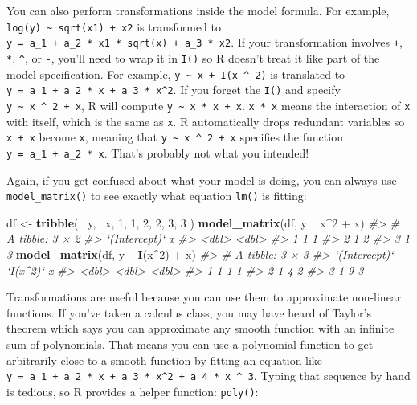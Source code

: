 \documentclass[]{book}
\newenvironment{Shaded}{\begin{snugshade}}{\end{snugshade}}
\newcommand{\KeywordTok}[1]{\textcolor[rgb]{0.13,0.29,0.53}{\textbf{{#1}}}}
\newcommand{\DecValTok}[1]{\textcolor[rgb]{0.00,0.00,0.81}{{#1}}}
\newcommand{\StringTok}[1]{\textcolor[rgb]{0.31,0.60,0.02}{{#1}}}
\newcommand{\CommentTok}[1]{\textcolor[rgb]{0.56,0.35,0.01}{\textit{{#1}}}}
\newcommand{\NormalTok}[1]{{#1}}
\begin{document}
You can also perform transformations inside the model formula. For
example, \texttt{log(y)\ \textasciitilde{}\ sqrt(x1)\ +\ x2} is
transformed to
\texttt{y\ =\ a\_1\ +\ a\_2\ *\ x1\ *\ sqrt(x)\ +\ a\_3\ *\ x2}. If your
transformation involves \texttt{+}, \texttt{*}, \texttt{\^{}}, or
\texttt{-}, you'll need to wrap it in \texttt{I()} so R doesn't treat it
like part of the model specification. For example,
\texttt{y\ \textasciitilde{}\ x\ +\ I(x\ \^{}\ 2)} is translated to
\texttt{y\ =\ a\_1\ +\ a\_2\ *\ x\ +\ a\_3\ *\ x\^{}2}. If you forget
the \texttt{I()} and specify
\texttt{y\ \textasciitilde{}\ x\ \^{}\ 2\ +\ x}, R will compute
\texttt{y\ \textasciitilde{}\ x\ *\ x\ +\ x}. \texttt{x\ *\ x} means the
interaction of \texttt{x} with itself, which is the same as \texttt{x}.
R automatically drops redundant variables so \texttt{x\ +\ x} become
\texttt{x}, meaning that \texttt{y\ \textasciitilde{}\ x\ \^{}\ 2\ +\ x}
specifies the function \texttt{y\ =\ a\_1\ +\ a\_2\ *\ x}. That's
probably not what you intended!

Again, if you get confused about what your model is doing, you can
always use \texttt{model\_matrix()} to see exactly what equation
\texttt{lm()} is fitting:

\begin{Shaded}
\begin{Highlighting}[]
\NormalTok{df <-}\StringTok{ }\KeywordTok{tribble}\NormalTok{(}
  \NormalTok{~y, ~x,}
   \DecValTok{1}\NormalTok{,  }\DecValTok{1}\NormalTok{,}
   \DecValTok{2}\NormalTok{,  }\DecValTok{2}\NormalTok{, }
   \DecValTok{3}\NormalTok{,  }\DecValTok{3}
\NormalTok{)}
\KeywordTok{model_matrix}\NormalTok{(df, y ~}\StringTok{ }\NormalTok{x^}\DecValTok{2} \NormalTok{+}\StringTok{ }\NormalTok{x)}
\CommentTok{#> # A tibble: 3 × 2}
\CommentTok{#>   `(Intercept)`     x}
\CommentTok{#>           <dbl> <dbl>}
\CommentTok{#> 1             1     1}
\CommentTok{#> 2             1     2}
\CommentTok{#> 3             1     3}
\KeywordTok{model_matrix}\NormalTok{(df, y ~}\StringTok{ }\KeywordTok{I}\NormalTok{(x^}\DecValTok{2}\NormalTok{) +}\StringTok{ }\NormalTok{x)}
\CommentTok{#> # A tibble: 3 × 3}
\CommentTok{#>   `(Intercept)` `I(x^2)`     x}
\CommentTok{#>           <dbl>    <dbl> <dbl>}
\CommentTok{#> 1             1        1     1}
\CommentTok{#> 2             1        4     2}
\CommentTok{#> 3             1        9     3}
\end{Highlighting}
\end{Shaded}

Transformations are useful because you can use them to approximate
non-linear functions. If you've taken a calculus class, you may have
heard of Taylor's theorem which says you can approximate any smooth
function with an infinite sum of polynomials. That means you can use a
polynomial function to get arbitrarily close to a smooth function by
fitting an equation like
\texttt{y\ =\ a\_1\ +\ a\_2\ *\ x\ +\ a\_3\ *\ x\^{}2\ +\ a\_4\ *\ x\ \^{}\ 3}.
Typing that sequence by hand is tedious, so R provides a helper
function: \texttt{poly()}:
\end{document}
